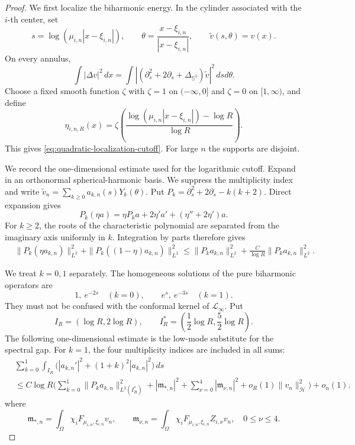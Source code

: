 \documentclass[11pt]{article}
\numberwithin{equation}{section}
\begin{document}
\begin{proof}
We first localize the biharmonic energy. In the cylinder associated
with the $i$-th center, set
\[
s=\log(\mu_{i,n}|x-\xi_{i,n}|),
\qquad
\theta=\frac{x-\xi_{i,n}}{|x-\xi_{i,n}|},
\qquad
\widetilde v(s,\theta)=v(x).
\]
On every annulus,
\begin{equation}\label{eq:Emden-Fowler-biharmonic}
\int |\Delta v|^2\,dx
=\int
\left|\left(\partial_s^2+2\partial_s
+\Delta_{\mathbb S^3}\right)\widetilde v\right|^2
\,dsd\theta.
\end{equation}
Choose a fixed smooth function $\zeta$ with $\zeta=1$ on
$(-\infty,0]$ and $\zeta=0$ on $[1,\infty)$, and define
\[
\eta_{i,n,R}(x)
=\zeta\left(
\frac{\log(\mu_{i,n}|x-\xi_{i,n}|)-\log R}
{\log R}
\right).
\]
This gives \eqref{eq:quadratic-localization-cutoff}. For large $n$ the
supports are disjoint.

We record the one-dimensional estimate used for the logarithmic
cutoff. Expand in an orthonormal spherical-harmonic basis. We suppress
the multiplicity index and write
$\widetilde v_n=\sum_{k\geq0}a_{k,n}(s)Y_k(\theta)$. Put
$P_k=\partial_s^2+2\partial_s-k(k+2)$. Direct expansion gives
\[
P_k(\eta a)=\eta P_ka+2\eta'a'
+(\eta''+2\eta')a.
\]
For $k\geq2$, the roots of the characteristic polynomial are
separated from the imaginary axis uniformly in $k$. Integration by
parts therefore gives
\begin{equation}\label{eq:high-mode-logarithmic-cutoff}
\begin{aligned}
&\|P_k(\eta a_{k,n})\|_{L^2}^2
+\|P_k((1-\eta)a_{k,n})\|_{L^2}^2\leq
\|P_ka_{k,n}\|_{L^2}^2
+\frac{C}{\log R}\|P_ka_{k,n}\|_{L^2}^2.
\end{aligned}
\end{equation}

We treat $k=0,1$ separately.  The homogeneous solutions of the
pure biharmonic operators are
\[
1,\ e^{-2s}\quad(k=0),
\qquad
e^s,\ e^{-3s}\quad(k=1).
\]
They must not be confused with the conformal kernel of
$\mathcal L_\infty$.  Put
\[
I_R=(\log R,2\log R),
\qquad
I_R^*=\left(\frac12\log R,\frac52\log R\right).
\]
The following one-dimensional estimate is the low-mode substitute
for the spectral gap.  For $k=1$, the four multiplicity indices are
included in all sums:
\begin{equation}\label{eq:low-mode-variation-bound}
\begin{aligned}
&\sum_{k=0}^1\int_{I_R}
\bigl(|a_{k,n}'|^2+(1+k)^2|a_{k,n}|^2\bigr)\,ds\\
&\leq C\log R\Bigg(
\sum_{k=0}^1\|P_ka_{k,n}\|_{L^2(I_R^*)}^2
+|\mathfrak m_{*,n}|^2
+\sum_{\nu=0}^4|\mathfrak m_{\nu,n}|^2
+o_R(1)\|v_n\|_{\mathcal H}^2\Bigg)+o_n(1).
\end{aligned}
\end{equation}
where
\[
\mathfrak m_{*,n}=\int_\Omega
\chi_iF_{\mu_{i,n},\xi_{i,n}}v_n,
\qquad
\mathfrak m_{\nu,n}=\int_\Omega
\chi_iF_{\mu_{i,n},\xi_{i,n}}Z_{i,\nu}v_n,
\quad0\leq\nu\leq4.
\]


\end{proof}
\end{document}
